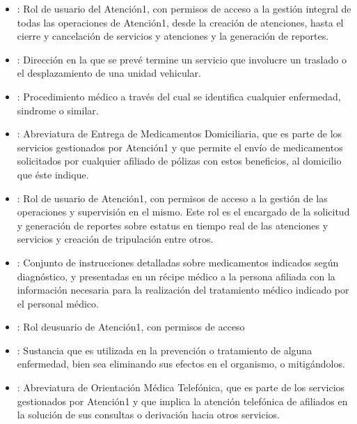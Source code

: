 \documentclass[letterpaper,10pt,spanish]{sphinxmanual}
\begin{document}
\begin{itemize}
\item {} 
: Rol de usuario del Atención\sphinxhyphen{}1, con permisos de acceso a la gestión integral de todas las operaciones de Atención\sphinxhyphen{}1, desde la creación de atenciones, hasta el cierre y cancelación de servicios y atenciones y la generación de reportes.

\item {} 
: Dirección en la que se prevé termine un servicio que involucre un traslado o el desplazamiento de una unidad vehicular.

\item {} 
: Procedimiento médico a través del cual se identifica cualquier enfermedad, sindrome o similar.

\item {} 
: Abreviatura de Entrega de Medicamentos Domiciliaria, que es parte de los servicios gestionados por Atención\sphinxhyphen{}1 y que permite el envío de medicamentos solicitados por cualquier afiliado de pólizas con estos beneficios, al domicilio que éste indique.

\item {} 
: Rol de usuario de Atención\sphinxhyphen{}1, con permisos de acceso a la gestión de las operaciones y supervisión en el mismo. Este rol es el encargado de la solicitud y generación de reportes sobre estatus en tiempo real de las atenciones y servicios y creación de tripulación entre otros.

\item {} 
: Conjunto de instrucciones detalladas sobre medicamentos indicados según diagnóstico, y presentadas en un récipe médico a la persona afiliada con la información necesaria para la realización del tratamiento médico indicado por el personal médico.

\item {} 
: Rol deusuario de Atención\sphinxhyphen{}1, con permisos de acceso

\item {} 
: Sustancia que es utilizada en la prevención o tratamiento de alguna enfermedad, bien sea eliminando sus efectos en el organismo, o mitigándolos.

\item {} 
: Abreviatura de Orientación Médica Telefónica, que es parte de los servicios gestionados por Atención\sphinxhyphen{}1 y que implica la atención telefónica de afiliados en la solución de sus consultas o derivación hacia otros servicios.


\end{itemize}
\end{document}
